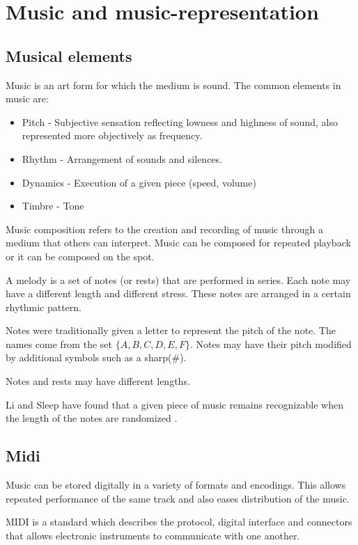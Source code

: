 \chapter{Music and music-representation}\label{ch:introduction}
\section{Musical elements}
Music is an art form for which the medium is sound.
The common elements in music are:
\begin{itemize}
\item Pitch - Subjective sensation reflecting lowness and highness of sound, also represented more objectively as frequency.
\item Rhythm - Arrangement of sounds and silences.
\item Dynamics - Execution of a given piece (speed, volume)
\item Timbre - Tone
\end{itemize}

Music composition refers to the creation and recording of music through a medium that others can interpret.  Music can be composed for repeated playback or it can be composed on the spot.

A melody is a set of notes (or rests) that are performed in series. Each note may have a different length and different stress. These notes are arranged in a certain rhythmic pattern.

Notes were traditionally given a letter to represent the pitch of the note. The names come from the set $\{A, B, C, D, E, F\}$. Notes may have their pitch modified by additional symbols such as a sharp($\#$).

Notes and rests may have different lengths.


Li and Sleep have found that a given piece of music remains recognizable when the length of the notes are randomized \cite{Ling2004}.

\section{Midi}
Music can be stored digitally in a variety of formats and encodings. This allows repeated performance of the same track and also eases distribution of the music.

\ac{MIDI} is a standard which describes the protocol, digital interface and connectors that allows electronic instruments to communicate with one another.

